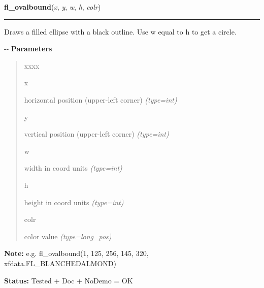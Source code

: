     \label{xformslib:flxbasic:fl_ovalbound}

    \vspace{0.5ex}

\hspace{.8\funcindent}\begin{boxedminipage}{\funcwidth}

    \raggedright \textbf{fl\_ovalbound}(\textit{x}, \textit{y}, \textit{w}, \textit{h}, \textit{colr})

    \vspace{-1.5ex}

    \rule{\textwidth}{0.5\fboxrule}
\setlength{\parskip}{2ex}

Draws a filled ellipse with a black outline. Use w equal to h to get a
circle.

-{}-
\setlength{\parskip}{1ex}
      \textbf{Parameters}
      \vspace{-1ex}

      \begin{quote}
        \begin{Ventry}{xxxx}

          \item[x]


horizontal position (upper-left corner)
            {\it (type=int)}

          \item[y]


vertical position (upper-left corner)
            {\it (type=int)}

          \item[w]


width in coord units
            {\it (type=int)}

          \item[h]


height in coord units
            {\it (type=int)}

          \item[colr]


color value
            {\it (type=long\_pos)}

        \end{Ventry}

      \end{quote}

\textbf{Note:} 
e.g. fl\_ovalbound(1, 125, 256, 145, 320, xfdata.FL\_BLANCHEDALMOND)


\textbf{Status:} 
Tested + Doc + NoDemo = OK


    \end{boxedminipage}

